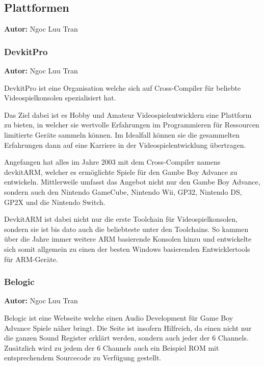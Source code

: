 \documentclass[11pt,a4paper]{scrartcl}
\newcommand{\AutorNgoc} {
    \vspace{-4mm}
    \large \textbf{Autor:} Ngoc Luu Tran \normalsize
    \vspace{2mm}
}
\begin{document}
\newpage


\subsection{Plattformen} \label{Plattformen}
\AutorNgoc


\subsubsection{DevkitPro}
\AutorNgoc

DevkitPro ist eine Organisation welche sich auf Cross-Compiler f\"{u}r beliebte Videospielkonsolen spezialisiert hat.

Das Ziel dabei ist es Hobby und Amateur Videospielentwicklern eine Plattform zu bieten, in welcher sie wertvolle Erfahrungen im Programmieren f\"{u}r Ressourcen limitierte Ger\"{a}te sammeln k\"{o}nnen. Im Idealfall k\"{o}nnen sie die gesammelten Erfahrungen dann auf eine Karriere in der Videospielentwicklung \"{u}bertragen.

Angefangen hat alles im Jahre 2003 mit dem Cross-Compiler namens devkitARM, welcher es erm\"{o}glichte Spiele f\"{u}r den Gambe Boy Advance zu entwickeln. Mittlerweile umfasst das Angebot nicht nur den Gambe Boy Advance, sondern auch den Nintendo GameCube, Nintendo Wii, GP32, Nintendo DS, GP2X und die Nintendo Switch. 

DevkitARM ist dabei nicht nur die erste Toolchain f\"{u}r Videospielkonsolen, sondern sie ist bis dato auch die beliebteste unter den Toolchains. So kammen \"{u}ber die Jahre immer weitere ARM basierende Konsolen hinzu und entwickelte sich somit allgemein zu einen der besten Windows basierenden Entwicklertools f\"{u}r ARM-Ger\"{a}te. 


\subsubsection{Belogic}
\AutorNgoc
 
Belogic ist eine Webseite welche einen Audio Development f\"{u}r Game Boy Advance Spiele n\"{a}her bringt. Die Seite ist insofern Hilfreich, da einen nicht nur die ganzen Sound Register erkl\"{a}rt werden, sondern auch jeder der 6 Channels. Zus\"{a}tzlich wird zu jedem der 6 Channels auch ein Beispiel ROM mit entsprechendem Sourcecode zu Verf\"{u}gung gestellt.
\end{document}
